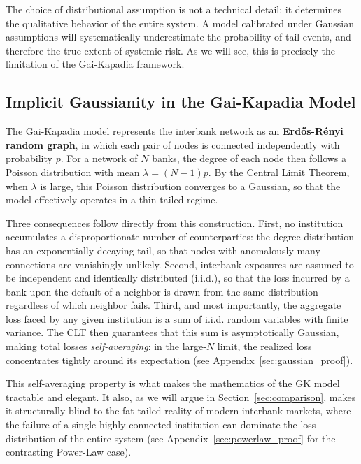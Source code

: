\documentclass[a4paper,12pt,twoside]{article}
\begin{document}
The choice of distributional assumption is not a technical detail; it 
determines the qualitative behavior of the entire system. A model 
calibrated under Gaussian assumptions will systematically underestimate 
the probability of tail events, and therefore the true extent of 
systemic risk. As we will see, this is precisely the limitation of the 
Gai-Kapadia framework.

\subsection{Implicit Gaussianity in the Gai-Kapadia Model}
\label{sec:implicit_gaussian}

The Gai-Kapadia model represents the interbank network as an 
\textbf{Erdős-Rényi random graph}, in which each pair of nodes is 
connected independently with probability $p$. For a network of $N$ 
banks, the degree of each node then follows a Poisson distribution with 
mean $\lambda = (N-1)p$. By the Central Limit Theorem, when $\lambda$ 
is large, this Poisson distribution converges to a Gaussian, so that 
the model effectively operates in a thin-tailed regime.

Three consequences follow directly from this construction. First, no 
institution accumulates a disproportionate number of counterparties: 
the degree distribution has an exponentially decaying tail, so that 
nodes with anomalously many connections are vanishingly unlikely. 
Second, interbank exposures are assumed to be independent and 
identically distributed (i.i.d.), so that the loss incurred by a bank 
upon the default of a neighbor is drawn from the same distribution 
regardless of which neighbor fails. Third, and most importantly, the 
aggregate loss faced by any given institution is a sum of i.i.d. 
random variables with finite variance. 
The CLT then guarantees that 
this sum is asymptotically Gaussian, making total losses 
\textit{self-averaging}: in the large-$N$ limit, the realized loss 
concentrates tightly around its expectation 
(see Appendix~\ref{sec:gaussian_proof}).

This self-averaging property is what makes the mathematics of the GK 
model tractable and elegant. It also, as we will argue in 
Section~\ref{sec:comparison}, makes it structurally blind to the 
fat-tailed reality of modern interbank markets, where the failure of a 
single highly connected institution can dominate the loss distribution 
of the entire system (see Appendix~\ref{sec:powerlaw_proof} for the 
contrasting Power-Law case).
\vspace{-0.8cm}
\end{document}
